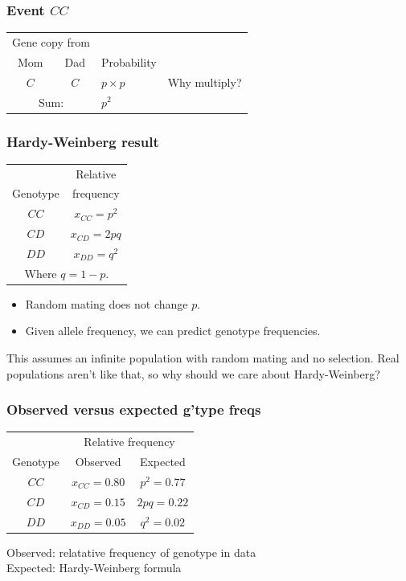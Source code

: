 \documentclass[handout]{beamer}
\begin{document}
\begin{frame}
\frametitle{Event $CC$}
\begin{center}
\begin{tabular}{ccll}
\multicolumn{2}{c}{Gene copy from}\\ \cline{1-2}
Mom  & Dad & Probability\\
\cline{1-3}
$C$  & $C$ & $p \times p$ & Why multiply?\\
\cline{1-3}
\multicolumn{2}{c}{Sum:} & $p^2$
\end{tabular}
\end{center}
\end{frame}

\begin{frame}
\frametitle{Hardy-Weinberg result}
\begin{center}
\begin{tabular}{cc}
  & Relative\\
Genotype & frequency\\ \hline
$CC$ & $x_{CC} = p^2$\\
$CD$ & $x_{CD} = 2pq$\\
$DD$ & $x_{DD} = q^2$\\\hline
\multicolumn{2}{c}{\rule{0pt}{2.5ex}Where $q=1-p$.}
\end{tabular}
\end{center}
\begin{itemize}
\item Random mating does not change $p$.
\item Given allele frequency, we can predict genotype frequencies.
\end{itemize}
\pause This assumes an infinite population with random mating and no
selection. Real populations aren't like that, so why should we care
about Hardy-Weinberg?
\end{frame}

\begin{frame}
\frametitle{Observed versus expected g'type freqs}
\begin{center}
  \begin{tabular}{ccc}
        & \multicolumn{2}{c}{Relative frequency}\\ \cline{2-3}
Genotype& Observed & Expected\\ \hline
$CC$ &$x_{CC} = 0.80$ & $p^2 = 0.77$\\
$CD$ &$x_{CD} = 0.15$ & $2pq = 0.22$\\
$DD$ &$x_{DD} = 0.05$ & $q^2=0.02$\\ \hline
\end{tabular}
\end{center}
Observed: relatative frequency of genotype in data\\
Expected: Hardy-Weinberg formula
\end{frame}
\end{document}
